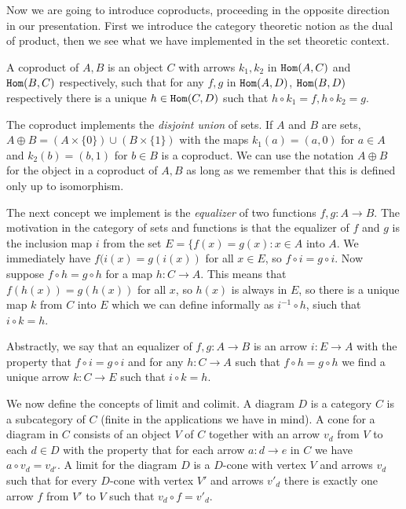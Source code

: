 \documentclass[12pt]{article}
\begin{document}
Now we are going to introduce coproducts, proceeding in the opposite direction in our presentation.  First we introduce the category theoretic notion as the dual of product, then we see what we have implemented in the set theoretic context.

A coproduct of $A,B$ is an object $C$ with arrows $k_1, k_2$ in ${\tt Hom}(A,C)$ and ${\tt Hom}(B,C)$ respectively, such that for any $f,g$ in ${\tt Hom}(A,D)$, ${\tt Hom}(B,D)$ respectively there is a unique $h \in {\tt Hom}(C,D)$ such that $ h \circ k_1 = f, h\circ k_2 =g$.

The coproduct implements the {\em disjoint union\/} of sets.  If $A$ and $B$ are sets, $A \oplus B = (A \times \{0\}) \cup (B \times \{1\})$ with the maps $k_1(a) = (a,0)$ for $a \in A$ and $k_2(b) = (b,1)$ for $b \in B$ is a coproduct.  We can use the notation $A \oplus B$ for
the object in a coproduct of $A,B$ as long as we remember that this is defined only up to isomorphism.

The next concept we implement is the {\em equalizer\/} of two functions $f, g:A \rightarrow B$.  The motivation in the category of sets and functions is that the equalizer of $f$ and $g$ is the inclusion map $i$ from  the set $E=\{f(x) = g(x):x \in A$ into $A$.  We immediately have $f(i(x) = g(i(x))$ for all $x \in E$, so $f \circ i = g\circ i$.
Now suppose $f \circ h = g \circ h$ for a map $h:C \rightarrow A$.  This means that $f(h(x)) = g(h(x))$ for all $x$, so $h(x)$ is always in $E$, so there is a unique map $k$ from $C$ into $E$ which we can define informally as $i^{-1}\circ h$, siuch that $i \circ k = h$.

Abstractly, we say that an equalizer of $f,g:A \rightarrow B$ is an arrow $i:E \rightarrow A$ with the property that $f \circ i = g\circ i$ and for any $h:C \rightarrow A$ such that $f \circ h = g \circ h$ we find a unique arrow $k:C \rightarrow E$ such that $i \circ  k = h$.

We now define the concepts of limit and colimit.  A diagram $D$ is a category $C$ is a subcategory of $C$ (finite in the applications we have in mind).  A cone for a diagram
in $C$ consists of an object $V$ of $C$ together with an arrow $v_d$ from $V$ to each $d \in D$ with the property that for each arrow $a:d \rightarrow e$ in $C$
we have $a \circ v_d = v_{d'}$.   A limit for the diagram $D$ is a $D$-cone with vertex $V$ and arrows $v_d$ such that for every $D$-cone with vertex $V'$ and arrows $v'_d$ there is exactly one arrow
$f$ from $V'$ to $V$ such that $v_d \circ f = v'_d$.
\end{document}
